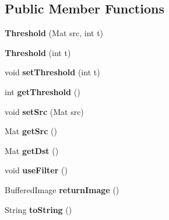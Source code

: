 \subsection*{Public Member Functions}
\begin{DoxyCompactItemize}
\item 
\mbox{\label{classapplication_1_1_threshold_a6fd29956bcd58e43ad59d818df26b7be}} 
{\bfseries Threshold} (Mat src, int t)
\item 
\mbox{\label{classapplication_1_1_threshold_a6d2e07c9c919807e0c6d20d48090c638}} 
{\bfseries Threshold} (int t)
\item 
\mbox{\label{classapplication_1_1_threshold_ab18e3584f9e6d2781e42e308448c242f}} 
void {\bfseries set\+Threshold} (int t)
\item 
\mbox{\label{classapplication_1_1_threshold_a9131e2a45039e6825fe0d8fbcf20b520}} 
int {\bfseries get\+Threshold} ()
\item 
\mbox{\label{classapplication_1_1_threshold_a00afaafb375777dc0ec3f35ee378a66d}} 
void {\bfseries set\+Src} (Mat src)
\item 
\mbox{\label{classapplication_1_1_threshold_a6e6adc9a0c5f8c127f3dac76deff89bb}} 
Mat {\bfseries get\+Src} ()
\item 
\mbox{\label{classapplication_1_1_threshold_af832db235dfa810f0f5793c46bf566c0}} 
Mat {\bfseries get\+Dst} ()
\item 
\mbox{\label{classapplication_1_1_threshold_a7b397ff95fd3d04f37463ffde1f64d30}} 
void {\bfseries use\+Filter} ()
\item 
\mbox{\label{classapplication_1_1_threshold_a02bb1cab613eed147b9aa513dcd413ca}} 
Buffered\+Image {\bfseries return\+Image} ()
\item 
\mbox{\label{classapplication_1_1_threshold_a086857e29eee77547a706c62e981b38f}} 
String {\bfseries to\+String} ()
\end{DoxyCompactItemize}
